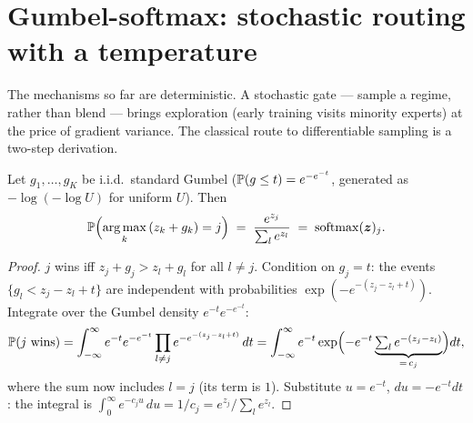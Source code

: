 \section{Gumbel-softmax: stochastic routing with a temperature}
\label{sec:gumbel}

The mechanisms so far are deterministic. A stochastic gate --- sample a
regime, rather than blend --- brings exploration (early training visits
minority experts) at the price of gradient variance. The classical route
to differentiable sampling is a two-step derivation.

\begin{lemma}\label{lem:gumbelmax}
Let $g_1, \dots, g_K$ be i.i.d.\ standard Gumbel
($\mathbb{P}(g \le t) = e^{-e^{-t}}$, generated as $-\log(-\log U)$ for
uniform $U$). Then
\[
  \mathbb{P}\Bigl(\operatorname*{arg\,max}_k\, (z_k + g_k) = j\Bigr)
  \;=\; \frac{e^{z_j}}{\sum_l e^{z_l}}
  \;=\; \operatorname{softmax}(\bm{z})_j .
\]
\end{lemma}

\begin{proof}
$j$ wins iff $z_j + g_j > z_l + g_l$ for all $l \ne j$. Condition on
$g_j = t$: the events $\{g_l < z_j - z_l + t\}$ are independent with
probabilities $\exp(-e^{-(z_j - z_l + t)})$. Integrate over the Gumbel
density $e^{-t} e^{-e^{-t}}$:
\[
  \mathbb{P}(j \text{ wins})
  = \int_{-\infty}^{\infty} e^{-t} e^{-e^{-t}}
    \prod_{l \ne j} e^{-e^{-(z_j - z_l + t)}}\, dt
  = \int_{-\infty}^{\infty} e^{-t}
    \exp\Bigl(-e^{-t} \underbrace{\textstyle\sum_l
    e^{-(z_j - z_l)}}_{=\,c_j}\Bigr) dt ,
\]
where the sum now includes $l = j$ (its term is $1$). Substitute
$u = e^{-t}$, $du = -e^{-t}dt$: the integral is
$\int_0^\infty e^{-c_j u}\, du = 1/c_j = e^{z_j}/\sum_l e^{z_l}$.
\end{proof}

